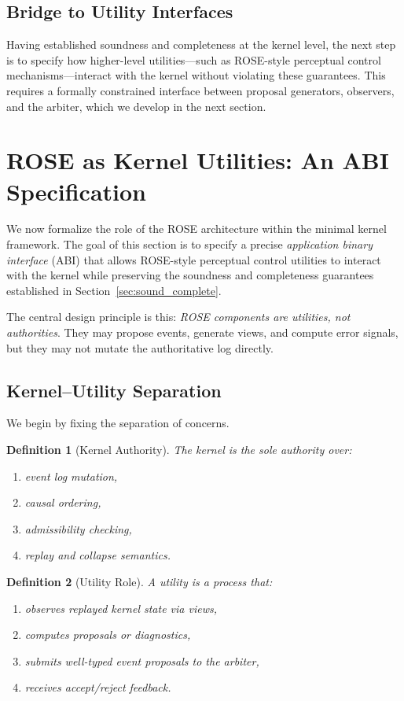 \documentclass[11pt]{article}
\newtheorem{definition}{Definition}
\begin{document}
\subsection{Bridge to Utility Interfaces}

Having established soundness and completeness at the kernel level, the next step is to specify how higher-level utilities—such as ROSE-style perceptual control mechanisms—interact with the kernel without violating these guarantees. This requires a formally constrained interface between proposal generators, observers, and the arbiter, which we develop in the next section.

\section{ROSE as Kernel Utilities: An ABI Specification}
\label{sec:rose_abi}

We now formalize the role of the ROSE architecture within the minimal kernel framework. The goal of this section is to specify a precise \emph{application binary interface} (ABI) that allows ROSE-style perceptual control utilities to interact with the kernel while preserving the soundness and completeness guarantees established in Section~\ref{sec:sound_complete}.

The central design principle is this: \emph{ROSE components are utilities, not authorities}. They may propose events, generate views, and compute error signals, but they may not mutate the authoritative log directly.

\subsection{Kernel--Utility Separation}

We begin by fixing the separation of concerns.

\begin{definition}[Kernel Authority]
The kernel is the sole authority over:
\begin{enumerate}
  \item event log mutation,
  \item causal ordering,
  \item admissibility checking,
  \item replay and collapse semantics.
\end{enumerate}
\end{definition}

\begin{definition}[Utility Role]
A \emph{utility} is a process that:
\begin{enumerate}
  \item observes replayed kernel state via views,
  \item computes proposals or diagnostics,
  \item submits well-typed event proposals to the arbiter,
  \item receives accept/reject feedback.
\end{enumerate}
\end{definition}
\end{document}
